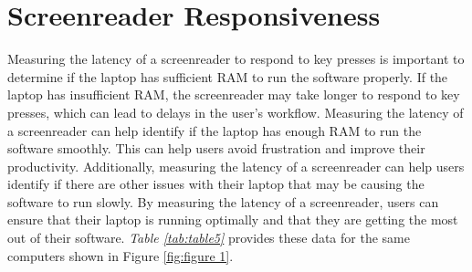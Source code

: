 \pagebreak
\hypertarget{screenreader-response}{}\section{Screenreader Responsiveness}\label{screenreader-response}
Measuring the latency of a screenreader to respond to key presses is important to determine if the laptop has sufficient RAM to run the software properly. If the laptop has insufficient RAM, the screenreader may take longer to respond to key presses, which can lead to delays in the user’s workflow. Measuring the latency of a screenreader can help identify if the laptop has enough RAM to run the software smoothly. This can help users avoid frustration and improve their productivity. Additionally, measuring the latency of a screenreader can help users identify if there are other issues with their laptop that may be causing the software to run slowly. By measuring the latency of a screenreader, users can ensure that their laptop is running optimally and that they are getting the most out of their software. \textit{Table \ref{tab:table5}} provides these data for the same computers shown in Figure \ref{fig:figure 1}.

\pagebreak 
 
